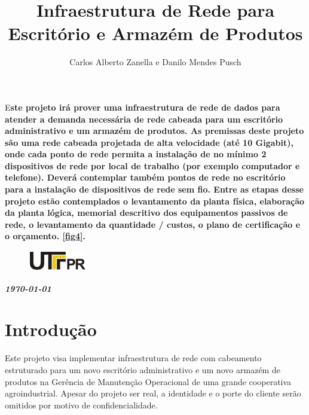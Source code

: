 \documentclass[	DIV=calc,%
							paper=a4,%
							fontsize=12pt,%
							onecolumn]{scrartcl}	 					%
\title{Infraestrutura de Rede para Escritório e Armazém de Produtos}					%
\author{Carlos Alberto Zanella e Danilo Mendes Pusch}  	%
\date{}																				%
\newcommand{\initial}[1]{%
     \lettrine[lines=3,lhang=0.3,nindent=0em]{
     				\color{DarkGoldenrod}
     				{\textsf{#1}}}{}}
\begin{document}
\maketitle
\thispagestyle{fancy} 	
\thispagestyle{empty}		%





\initial{E}\textbf{ste projeto irá prover uma infraestrutura de rede de dados para atender a demanda necessária de rede cabeada para um escritório administrativo e um armazém de produtos. As premissas deste projeto são uma rede cabeada projetada de alta velocidade (até 10 Gigabit), onde cada ponto de rede permita a instalação de no mínimo 2 dispositivos de rede por local de trabalho (por exemplo computador e telefone). Deverá contemplar também pontos de rede no escritório para a instalação de dispositivos de rede sem fio. Entre as etapas desse projeto estão contemplados o levantamento da planta física, elaboração da planta lógica, memorial descritivo dos equipamentos passivos de rede, o levantamento da quantidade / custos, o plano de certificação e o orçamento.  \ref{fig4}.}


\begin{figure}
	\centering
	\includegraphics{utfpr}
\end{figure}

\vspace{2cm}
\centerline{\textit{\textbf{\today}}}

\clearpage
    \renewcommand*\listfigurename{Lista de figuras}
\listoffigures

\renewcommand*\listtablename{Lista de tabelas}
\listoftables




\clearpage
\renewcommand{\contentsname}{Sumário}
\tableofcontents
\clearpage

\section{Introdução}
Este projeto visa implementar infraestrutura de rede com cabeamento estruturado para um novo escritório administrativo e um novo armazém de produtos na Gerência de Manutenção Operacional de uma grande cooperativa agroindustrial. Apesar do projeto ser real, a identidade e o porte do cliente serão omitidos por motivo de confidencialidade. 
\end{document}
